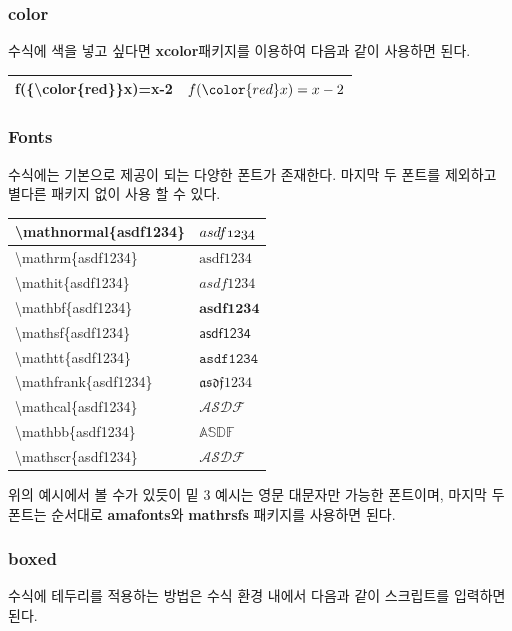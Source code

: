 \documentclass[12pt]{article}
\begin{document}
	\subsubsection{color}
	수식에 색을 넣고 싶다면 \textbf{xcolor}패키지를 이용하여 다음과 같이 사용하면 된다.\newline
	
	\begin{tabularx}{\textwidth\onehalfspacing}{|X|X|}
		\hline
		f(\{\textbackslash color\{red\}\}x)=x-2&\(f({\color{red}x})=x-2\)\\
		\hline
	\end{tabularx}
	\subsubsection{Fonts}
	수식에는 기본으로 제공이 되는 다양한 폰트가 존재한다. 마지막 두 폰트를 제외하고 별다른 패키지 없이 사용 할 수 있다.\newline
	
	\begin{tabularx}{\textwidth\onehalfspacing}{|X|X|}
		\hline
		\textbackslash mathnormal\{asdf1234\}&\(\mathnormal{asdf1234}\)\\
		\hline
		\textbackslash mathrm\{asdf1234\}&\(\mathrm{asdf1234}\)\\
		\hline
		\textbackslash mathit\{asdf1234\}&\(\mathit{asdf1234}\)\\
		\hline
		\textbackslash mathbf\{asdf1234\}&\(\mathbf{asdf1234}\)\\
		\hline
		\textbackslash mathsf\{asdf1234\}&\(\mathsf{asdf1234}\)\\
		\hline
		\textbackslash mathtt\{asdf1234\}&\(\mathtt{asdf1234}\)\\
		\hline
		\textbackslash mathfrank\{asdf1234\}&\(\mathfrak{asdf1234}\)\\
		\hline
		\textbackslash mathcal\{asdf1234\}&\(\mathcal{ASDF}\)\\
		\hline
		\textbackslash mathbb\{asdf1234\}&\(\mathbb{ASDF}\)\\
		\hline
		\textbackslash mathscr\{asdf1234\}&\(\mathscr{ASDF}\)\\
		\hline
	\end{tabularx}\newline\newline
	위의 예시에서 볼 수가 있듯이 밑 3 예시는 영문 대문자만 가능한 폰트이며, 마지막 두 폰트는 순서대로 \textbf{amafonts}와 \textbf{mathrsfs} 패키지를 사용하면 된다.
	\subsubsection{boxed}
	수식에 테두리를 적용하는 방법은 수식 환경 내에서 다음과 같이 스크립트를 입력하면 된다.\newline
	
\end{document}

